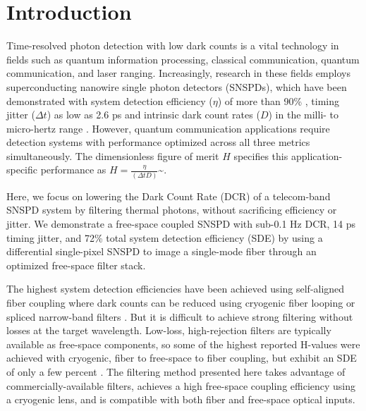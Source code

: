 \documentclass[11pt]{caltech_thesis} %
\begin{document}
\hypertarget{introduction}{%
\section{Introduction}\label{introduction}}

Time-resolved photon detection with low dark counts is a vital
technology in fields such as quantum information processing, classical
communication, quantum communication, and laser ranging. Increasingly,
research in these fields employs superconducting nanowire single photon
detectors (SNSPDs), which have been demonstrated with system detection
efficiency ($\eta$) of more than 90\% \autocite{Reddy2020}, timing
jitter ($\Delta t$) as low as 2.6 ps \autocite{Korzh2020} and intrinsic
dark count rates ($D$) in the milli- to micro-hertz range
\autocite{Hochberg2019}. However, quantum communication applications
require detection systems with performance optimized across all three
metrics simultaneously. The dimensionless figure of merit $H$ specifies
this application-specific performance as
$H = \frac{\eta}{(\Delta t D)}$\textasciitilde{}\autocite{Hadfield2009}.

Here, we focus on lowering the Dark Count Rate (DCR) of a telecom-band
SNSPD system by filtering thermal photons, without sacrificing
efficiency or jitter. We demonstrate a free-space coupled SNSPD with
sub-0.1 Hz DCR, 14 ps timing jitter, and 72\% total system detection
efficiency (SDE) by using a differential single-pixel SNSPD
\autocite{Colangelo2021} to image a single-mode fiber through an
optimized free-space filter stack.

The highest system detection efficiencies have been achieved using
self-aligned fiber coupling where dark counts can be reduced using
cryogenic fiber looping \autocite{Cohen2015} or spliced narrow-band
filters \autocite{Boaron2018secure}. But it is difficult to achieve
strong filtering without losses at the target wavelength. Low-loss,
high-rejection filters are typically available as free-space components,
so some of the highest reported H-values were achieved with cryogenic,
fiber to free-space to fiber coupling, but exhibit an SDE of only a few
percent \autocite{Shibata2015}. The filtering method presented here
takes advantage of commercially-available filters, achieves a high
free-space coupling efficiency using a cryogenic lens, and is compatible
with both fiber and free-space optical inputs.
\end{document}
